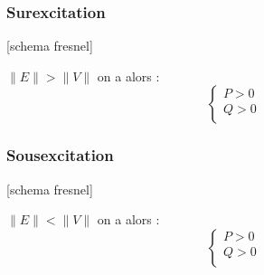 \documentclass[main.tex]{subfiles}
\begin{document}
\subsubsection{Surexcitation}

[schema fresnel]
\begin{prop}
$
\|E\| > \|V\|
$ on a alors :
\[
  \begin{cases}
    P > 0 \\
     Q >0 \\
  \end{cases}
\]
\end{prop}
\subsubsection{Sousexcitation}
[schema fresnel]
\begin{prop}
$
\|E\| < \|V\|
$ on a alors :
\[
  \begin{cases}
    P > 0 \\
     Q >0 \\
  \end{cases}
\]
\end{prop}
\end{document}
